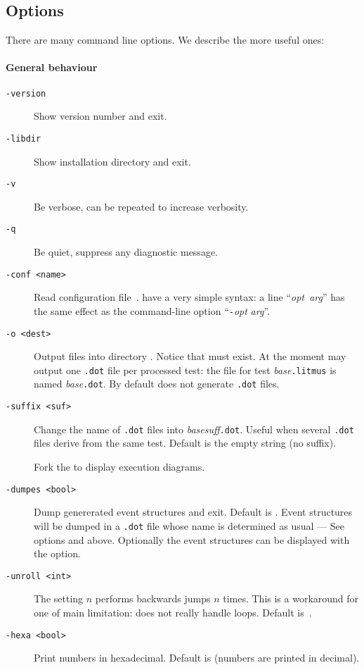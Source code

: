 \subsection{Options}
There are many command line options.
We describe the more useful ones:

\paragraph*{General behaviour}
\begin{description}
\item[{\tt -version}] Show version number and exit.
\item[{\tt -libdir}] Show installation directory and exit.
\item[{\tt -v}] Be verbose, can be repeated to increase verbosity.
\item[{\tt -q}] Be quiet, suppress any diagnostic message.
\item[{\tt -conf <name>}] Read configuration file~.
 have a very simple syntax:
a line ``\textit{opt}\texttt{  }\textit{arg}'' has the same effect as
the command-line option ``\texttt{-}\textit{opt} \textit{arg}''.
\item[{\tt -o <dest>}] Output files into directory .
Notice that  must exist.
At the moment \herd{} may output one \texttt{.dot} file per processed test:
the file for test \textit{base}\texttt{.litmus}
is named  \textit{base}\texttt{.dot}.
By default \herd{} does not generate \texttt{.dot} files.
\item[{\tt -suffix <suf>}] Change the name of \texttt{.dot} files
into \textit{base}\textit{suff}\texttt{.dot}. Useful when several \texttt{.dot} files derive from the same test. Default is the empty string (no suffix).
\item[{\tt {}}] Fork the  to display execution diagrams.
\item[{\tt -dumpes <bool>}]
Dump genererated event structures and exit. Default is .
Event structures will be dumped in a \texttt{.dot} file whose
name is determined as usual --- See options  and  above.
Optionally the event structures can be displayed with the  option.
\item[{\tt -unroll <int>}] The setting $n$ performs backwards
jumps $n$ times. This is a workaround for one of \herd{} main limitation:
\herd{} does not really handle loops. Default is~.
\item[{\tt -hexa <bool>}] Print numbers in hexadecimal. Default is 
(numbers are printed in decimal).
\end{description}

